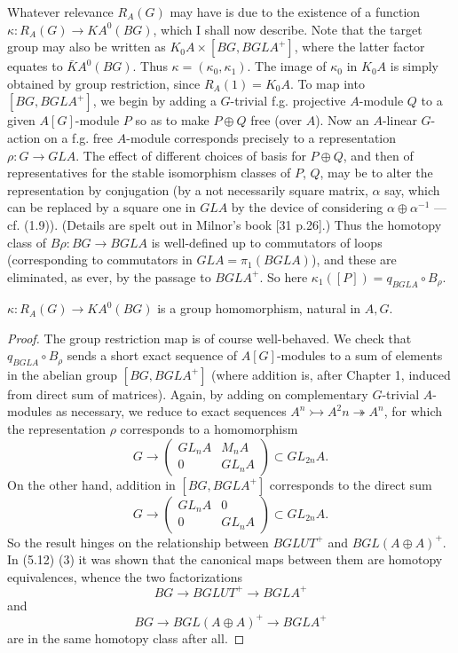 Whatever relevance $R_A(G)$ may have is due to the existence of a function $\kappa  \colon   R_A(G)\longrightarrow KA^0(BG)$, which I shall now describe. Note that the target group may also be written as $K_0A \times [BG, BGLA^+]$, where the latter factor equates to $\bar{K}A^0(BG)$. Thus $\kappa  = (\kappa_0, \kappa_1 )$. The image of $\kappa_0$ in $K_0A$ is simply obtained by group restriction, since $R_A(1) = K_0A$. To map into $[BG, BGLA^+]$, we begin by adding a $G$-trivial f.g. projective $A$-module $Q$ to a given $A[G]$-module $P$ so as to make $P \oplus Q$ free (over $A$). Now an $A$-linear $G$-action on a f.g. free $A$-module corresponds precisely to a representation $\rho \colon   G\longrightarrow GLA$. The effect of different choices of basis for $P \oplus Q$, and then of representatives for the stable isomorphism classes of $P$, $Q$, may be to alter the representation by conjugation (by a not necessarily square matrix, $\alpha$ say, which can be replaced by a square one in $GLA$ by the device of considering $\alpha \oplus \alpha
^{-1}$ --- cf. (1.9)). (Details are spelt out in Milnor's book [31 p.26].) Thus the homotopy class of $B\rho \colon   BG\longrightarrow BGLA$ is well-defined up to commutators of loops (corresponding to commutators in $GLA = \pi_1(BGLA)$), and these are eliminated, as ever, by the passage to $BGLA^+$. So here $\kappa_1([P]) = q_{BGLA}\circ B_\rho$.
\begin{lemma}
  $\kappa \colon   R_A(G) \longrightarrow KA^0(BG)$ is a group homomorphism, natural in $A, G$.
\end{lemma}
\begin{proof}
The group restriction map is of course well-behaved. We check that $q_{BGLA}\circ B_\rho$ sends a short exact sequence of $A[G]$-modules to a sum of elements in the abelian group $[BG, BGLA^+]$ (where addition is, after Chapter 1, induced from direct sum of matrices). Again, by adding on complementary $G$-trivial $A$-modules as necessary, we reduce to exact sequences $A^n \rightarrowtail A^2n\twoheadrightarrow A^n$, for which the representation $\rho$ corresponds to a homomorphism
\[G\longrightarrow \begin{pmatrix}
  GL_nA & M_nA \\0& GL_nA
\end{pmatrix} \subset GL_{2n}A.\]
On the other hand, addition in $[BG, BGLA^+]$ corresponds to the direct sum
\[G\longrightarrow \begin{pmatrix}
  GL_nA & 0 \\0& GL_nA
\end{pmatrix} \subset GL_{2n}A.\]
So the result hinges on the relationship between $BGLUT^+$ and $BGL(A\oplus A)^+$. In (5.12) (3) it was shown that the canonical maps between them are homotopy equivalences, whence the two
factorizations
\[BG\longrightarrow BGLUT^+ \longrightarrow BGLA^+\]
and 
\[BG \longrightarrow  BGL(A\oplus A)^+ \longrightarrow BGLA^+\]
are in the same homotopy class after all.
\end{proof}

